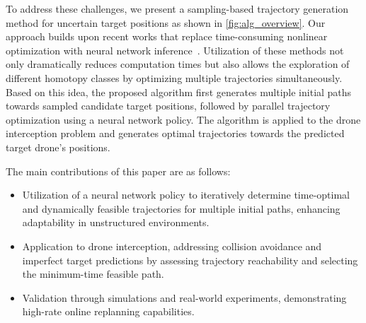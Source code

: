 To address these challenges, we present a sampling-based trajectory generation method for uncertain target positions as shown in \cref{fig:alg_overview}.
Our approach builds upon recent works that replace time-consuming nonlinear optimization with neural network inference~\cite{ryou2024multi, wu2023learning, penicka2022learning, zhao2024learning}.
Utilization of these methods not only dramatically reduces computation times but also allows the exploration of different homotopy classes by optimizing multiple trajectories simultaneously.
Based on this idea, the proposed algorithm first generates multiple initial paths towards sampled candidate target positions, followed by parallel trajectory optimization using a neural network policy. 
The algorithm is applied to the drone interception problem and generates optimal trajectories towards the predicted target drone's positions.

The main contributions of this paper are as follows:



\begin{itemize}
    \item Utilization of a neural network policy to iteratively determine time-optimal and dynamically feasible trajectories for multiple initial paths, enhancing adaptability in unstructured environments.
    \item Application to drone interception, addressing collision avoidance and imperfect target predictions by assessing trajectory reachability and selecting the minimum-time feasible path.
    \item Validation through simulations and real-world experiments, demonstrating high-rate online replanning capabilities.
\end{itemize}
